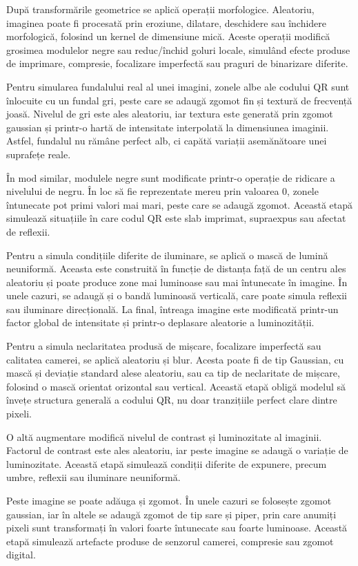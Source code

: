 După transformările geometrice se aplică operații morfologice. Aleatoriu, imaginea poate fi procesată prin eroziune, dilatare, deschidere sau închidere morfologică, folosind un kernel de dimensiune mică. Aceste operații modifică grosimea modulelor negre sau reduc/închid goluri locale, simulând efecte produse de imprimare, compresie, focalizare imperfectă sau praguri de binarizare diferite.

Pentru simularea fundalului real al unei imagini, zonele albe ale codului QR sunt înlocuite cu un fundal gri, peste care se adaugă zgomot fin și textură de frecvență joasă. Nivelul de gri este ales aleatoriu, iar textura este generată prin zgomot gaussian și printr-o hartă de intensitate interpolată la dimensiunea imaginii. Astfel, fundalul nu rămâne perfect alb, ci capătă variații asemănătoare unei suprafețe reale.

În mod similar, modulele negre sunt modificate printr-o operație de ridicare a nivelului de negru. În loc să fie reprezentate mereu prin valoarea $0$, zonele întunecate pot primi valori mai mari, peste care se adaugă zgomot. Această etapă simulează situațiile în care codul QR este slab imprimat, supraexpus sau afectat de reflexii.

Pentru a simula condițiile diferite de iluminare, se aplică o mască de lumină neuniformă. Aceasta este construită în funcție de distanța față de un centru ales aleatoriu și poate produce zone mai luminoase sau mai întunecate în imagine. În unele cazuri, se adaugă și o bandă luminoasă verticală, care poate simula reflexii sau iluminare direcțională. La final, întreaga imagine este modificată printr-un factor global de intensitate și printr-o deplasare aleatorie a luminozității.

Pentru a simula neclaritatea produsă de mișcare, focalizare imperfectă sau calitatea camerei, se aplică aleatoriu și blur. Acesta poate fi de tip Gaussian, cu mască și deviație standard alese aleatoriu, sau ca tip de neclaritate de mișcare, folosind o mască orientat orizontal sau vertical. Această etapă obligă modelul să învețe structura generală a codului QR, nu doar tranzițiile perfect clare dintre pixeli.

O altă augmentare modifică nivelul de contrast și luminozitate al imaginii. Factorul de contrast este ales aleatoriu, iar peste imagine se adaugă o variație de luminozitate. Această etapă simulează condiții diferite de expunere, precum umbre, reflexii sau iluminare neuniformă.

Peste imagine se poate adăuga și zgomot. În unele cazuri se folosește zgomot gaussian, iar în altele se adaugă zgomot de tip sare și piper, prin care anumiți pixeli sunt transformați în valori foarte întunecate sau foarte luminoase. Această etapă simulează artefacte produse de senzorul camerei, compresie sau zgomot digital.

